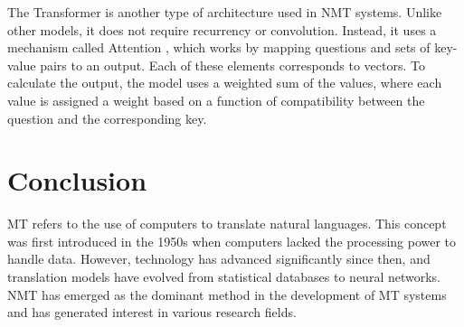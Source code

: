 \documentclass[a4paper]{article}
\begin{document}
    The Transformer is another type of architecture used in NMT systems. 
    Unlike other models, it does not require recurrency or convolution. 
    Instead, it uses a mechanism called Attention 
    \cite{vaswani:2017attention}, which works by 
    mapping questions and sets of key-value pairs to an output. 
    Each of these elements corresponds to vectors. To calculate the 
    output, the model uses a weighted sum of the values, where each 
    value is assigned a weight based on a function of compatibility 
    between the question and the corresponding key.

    \section*{Conclusion}

    MT refers to the use of computers to translate natural languages. 
    This concept was first introduced in the 1950s when computers 
    lacked the processing power to handle data. 
    However, technology has advanced significantly since then, and 
    translation models have evolved from statistical databases to 
    neural networks.
    NMT has emerged as the dominant method in the development of MT 
    systems and has generated interest in various research fields.



 
\end{document}
